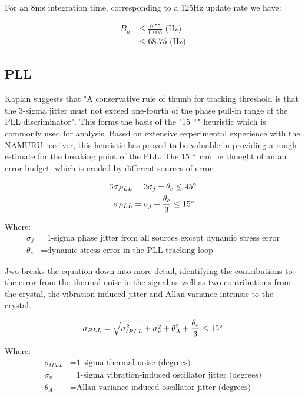 For an 8ms integration time, corresponding to a 125Hz update rate we have:

\begin{align*}
B_n &\leq \frac{0.55}{0.008} \text{ (Hz)}\\
    &\leq 68.75 \text{ (Hz)}
\end{align*}

\subsection{PLL}
Kaplan suggests that "A conservative rule of thumb for tracking threshold is that the 3-sigma jitter must not exceed one-fourth of the phase pull-in range of the PLL discriminator"\cite{Kaplan}. This forms the basis of the "15 $\degree$" heuristic which is commonly used for analysis. Based on extensive experimental experience with the \ac{NAMURU} receiver, this heuristic has proved to be valuable in providing a rough estimate for the breaking point of the PLL. The 15 $\degree$ can be thought of an an error budget, which is eroded by different sources of error.

\begin{align}
3 \sigma_{PLL} &= 3 \sigma_j +\theta_e \leq 45 \degree\\
\sigma_{PLL} &=\sigma_j + \frac{\theta_e}{3} \leq 15 \degree
\label{eq:WardJitter}
\end{align}

Where:
\begin{align*}
\sigma_j &= \text{1-sigma phase jitter from all sources except dynamic stress error} \\
\theta_e &= \text{dynamic stress error in the PLL tracking loop}
\end{align*}

Jwo breaks the equation down into more detail\cite{Jwo}, identifying the contributions to the error from the thermal noise in the signal as well as two contributions from the crystal, the vibration induced jitter and Allan variance intrinsic to the crystal.


\begin{equation}
\sigma_{PLL} = \sqrt{\sigma^2_{tPLL} + \sigma^2_v+ \theta^2_A} + \frac{\theta_e}{3} \leq 15 \degree 
\label{eq:JwoJitter}
\end{equation}

Where:
\begin{align*}
\sigma_{tPLL} &= \text{1-sigma thermal noise (degrees)}\\
\sigma_v &= \text{1-sigma vibration-induced oscillator jitter (degrees)}\\
\theta_A &= \text{Allan variance induced oscillator jitter (degrees)}
\end{align*}


